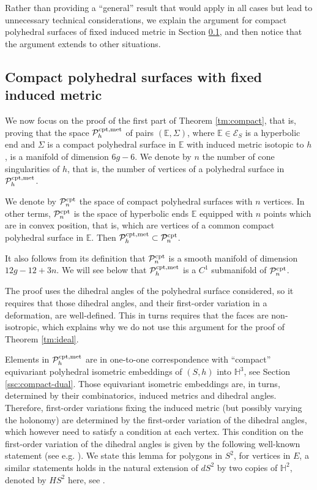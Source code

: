 \documentclass[notitlepage,twoside,a4paper]{amsart}
\newcommand{\Pcomet}{\cP^{\rm cpt,met}_{h}}
\newcommand{\Pcon}{\cP^{\rm cpt}_{n}}
\theoremstyle{named}
\newcommand{\HH}{{\mathbb H}}
\newcommand{\bE}{{\mathbb E}}
\newcommand{\cE}{{\mathcal E}}
\newcommand{\cP}{{\mathcal P}}
\newcounter{notes}%
\newcommand{\marginnote}[1]{
\refstepcounter{notes}  %
\nolinebreak
$\hspace{-5pt}{}^{\text{\tiny \rm \arabic{notes}}}$
\marginpar{\tiny \arabic{notes}) #1}
}
\begin{document}
Rather than providing a ``general'' result that would apply in all cases but lead to unnecessary technical considerations, we explain the argument for compact polyhedral surfaces of fixed induced metric in Section \ref{ssc:defo-compact}, and then notice that the argument extends to other situations.

\subsection{Compact polyhedral surfaces with fixed induced metric}
\label{ssc:defo-compact}

We now focus on the proof of the first part of Theorem \ref{tm:compact}, that is, proving that the space $\Pcomet$ of pairs $(\bE,\Sigma)$, where $\bE\in \cE_S$ is a hyperbolic end and $\Sigma$ is a compact polyhedral surface in $\bE$ with induced metric isotopic to $h$, is a manifold of dimension $6g-6$. We denote by $n$ the number of cone singularities of $h$, that is, the number of vertices of a polyhedral surface in $\Pcomet$.

We denote by $\Pcon$ the space of compact polyhedral surfaces with $n$ vertices. In other terms, $\Pcon$ is the space of hyperbolic ends $\bE$ equipped with $n$ points which are in convex position, that is, which are vertices of a common compact polyhedral surface in $\bE$. Then $\Pcomet\subset \Pcon$. 

It also follows from its definition that $\Pcon$ is a smooth manifold of dimension $12g-12+3n$. We will see below that $\Pcomet$ is a $C^1$ submanifold of $\Pcon$.

The proof uses the dihedral angles of the polyhedral surface considered, so it requires that those dihedral angles, and their first-order variation in a deformation, are well-defined. This in turns requires that the faces are non-isotropic, which explains why we do not use this argument for the proof of Theorem \ref{tm:ideal}.

Elements in $\Pcomet$ are in one-to-one correspondence with ``compact'' equivariant polyhedral isometric embeddings of $(S,h)$ into $\HH^3$, see Section \ref{ssc:compact-dual}. Those equivariant isometric embeddings are, in turns, determined by their combinatorics, induced metrics and dihedral angles. Therefore, first-order variations fixing the induced metric (but possibly varying the holonomy) are determined by the first-order variation of the dihedral angles, which however need to satisfy a condition at each vertex. This condition on the first-order variation of the dihedral angles is given by the following well-known statement (see e.g. \cite[Theorem $A_S$]{polygones}). We state this lemma for polygons in $S^2$, for vertices in $E$, a similar statements holds in the natural extension of $dS^2$ by two copies of $\HH^2$, denoted by $HS^2$ here, see \cite{colI}.%
\end{document}
